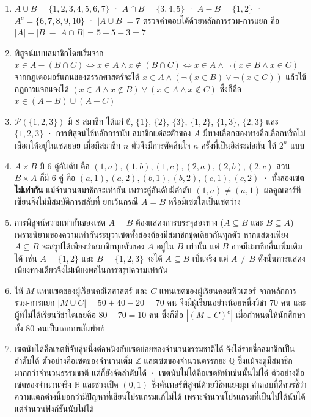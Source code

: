 \begin{enumerate}
    \item $A \cup B = \{1,2,3,4,5,6,7\}$ · $A \cap B = \{3,4,5\}$ · $A - B = \{1,2\}$ · $A^c = \{6,7,8,9,10\}$ · $|A \cup B| = 7$ ตรวจคำตอบได้ด้วยหลักการรวม-การแยก คือ $|A| + |B| - |A \cap B| = 5 + 5 - 3 = 7$

    \item พิสูจน์แบบสมาชิกโดยเริ่มจาก $x \in A - (B \cap C) \Leftrightarrow x \in A \land x \notin (B \cap C) \Leftrightarrow x \in A \land \neg(x \in B \land x \in C)$ จากกฎเดอมอร์แกนของตรรกศาสตร์จะได้ $x \in A \land (\neg(x \in B) \lor \neg(x \in C))$ แล้วใช้กฎการแจกแจงได้ $(x \in A \land x \notin B) \lor (x \in A \land x \notin C)$ ซึ่งก็คือ $x \in (A - B) \cup (A - C)$

    \item $\mathcal{P}(\{1,2,3\})$ มี 8 สมาชิก ได้แก่ $\emptyset$, $\{1\}$, $\{2\}$, $\{3\}$, $\{1,2\}$, $\{1,3\}$, $\{2,3\}$ และ $\{1,2,3\}$ · การพิสูจน์ใช้หลักการนับ สมาชิกแต่ละตัวของ $A$ มีทางเลือกสองทางคือเลือกหรือไม่เลือกให้อยู่ในเซตย่อย เมื่อมีสมาชิก $n$ ตัวจึงมีการตัดสินใจ $n$ ครั้งที่เป็นอิสระต่อกัน ได้ $2^n$ แบบ

    \item $A \times B$ มี 6 คู่อันดับ คือ $(1,a),(1,b),(1,c),(2,a),(2,b),(2,c)$ ส่วน $B \times A$ ก็มี 6 คู่ คือ $(a,1),(a,2),(b,1),(b,2),(c,1),(c,2)$ · ทั้งสองเซต\textbf{ไม่เท่ากัน} แม้จำนวนสมาชิกจะเท่ากัน เพราะคู่อันดับมีลำดับ $(1,a) \neq (a,1)$ ผลคูณคาร์ทีเซียนจึงไม่มีสมบัติการสลับที่ ยกเว้นกรณี $A = B$ หรือมีเซตใดเป็นเซตว่าง

    \item การพิสูจน์ความเท่ากันของเซต $A = B$ ต้องแสดงการบรรจุสองทาง ($A \subseteq B$ และ $B \subseteq A$) เพราะนิยามของความเท่ากันระบุว่าเซตทั้งสองต้องมีสมาชิกชุดเดียวกันทุกตัว หากแสดงเพียง $A \subseteq B$ จะสรุปได้เพียงว่าสมาชิกทุกตัวของ $A$ อยู่ใน $B$ เท่านั้น แต่ $B$ อาจมีสมาชิกอื่นเพิ่มเติมได้ เช่น $A = \{1, 2\}$ และ $B = \{1, 2, 3\}$ จะได้ $A \subseteq B$ เป็นจริง แต่ $A \neq B$ ดังนั้นการแสดงเพียงทางเดียวจึงไม่เพียงพอในการสรุปความเท่ากัน

    \item ให้ $M$ แทนเซตของผู้เรียนคณิตศาสตร์ และ $C$ แทนเซตของผู้เรียนคอมพิวเตอร์ จากหลักการรวม-การแยก $|M \cup C| = 50 + 40 - 20 = 70$ คน จึงมีผู้เรียนอย่างน้อยหนึ่งวิชา 70 คน และผู้ที่ไม่ได้เรียนวิชาใดเลยคือ $80 - 70 = 10$ คน ซึ่งก็คือ $|(M \cup C)^c|$ เมื่อกำหนดให้นักศึกษาทั้ง 80 คนเป็นเอกภพสัมพัทธ์

    \item เซตนับได้คือเซตที่จับคู่หนึ่งต่อหนึ่งกับเซตย่อยของจำนวนธรรมชาติได้ จึงไล่รายชื่อสมาชิกเป็นลำดับได้ ตัวอย่างคือเซตของจำนวนเต็ม $\mathbb{Z}$ และเซตของจำนวนตรรกยะ $\mathbb{Q}$ ซึ่งแม้จะดูมีสมาชิกมากกว่าจำนวนธรรมชาติ แต่ก็ยังจัดลำดับได้ · เซตนับไม่ได้คือเซตที่ทำเช่นนั้นไม่ได้ ตัวอย่างคือเซตของจำนวนจริง $\mathbb{R}$ และช่วงเปิด $(0,1)$ ซึ่งคันทอร์พิสูจน์ด้วยวิธีทแยงมุม คำตอบที่ดีควรชี้ว่าความแตกต่างนี้บอกว่ามีปัญหาที่เขียนโปรแกรมแก้ไม่ได้ เพราะจำนวนโปรแกรมที่เป็นไปได้นับได้ แต่จำนวนฟังก์ชันนับไม่ได้


\end{enumerate}
